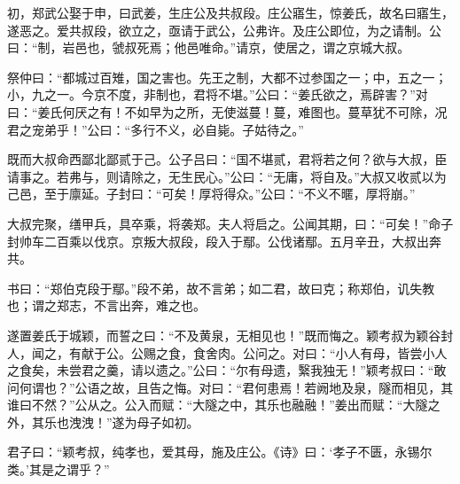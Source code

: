 
初，郑武公娶于申，曰武姜，生庄公及共叔段。庄公寤生，惊姜氏，故名曰寤生，遂恶之。爱共叔段，欲立之，亟请于武公，公弗许。及庄公即位，为之请制。公曰：“制，岩邑也，虢叔死焉；他邑唯命。”请京，使居之，谓之京城大叔。

祭仲曰：“都城过百雉，国之害也。先王之制，大都不过参国之一；中，五之一；小，九之一。今京不度，非制也，君将不堪。”公曰：“姜氏欲之，焉辟害？”对曰：“姜氏何厌之有！不如早为之所，无使滋蔓！蔓，难图也。蔓草犹不可除，况君之宠弟乎！”公曰：“多行不义，必自毙。子姑待之。”

既而大叔命西鄙北鄙贰于己。公子吕曰：“国不堪贰，君将若之何？欲与大叔，臣请事之。若弗与，则请除之，无生民心。”公曰：“无庸，将自及。”大叔又收贰以为己邑，至于廪延。子封曰：“可矣！厚将得众。”公曰：“不义不暱，厚将崩。”

大叔完聚，缮甲兵，具卒乘，将袭郑。夫人将启之。公闻其期，曰：“可矣！”命子封帅车二百乘以伐京。京叛大叔段，段入于鄢。公伐诸鄢。五月辛丑，大叔出奔共。

书曰：“郑伯克段于鄢。”段不弟，故不言弟；如二君，故曰克；称郑伯，讥失教也；谓之郑志，不言出奔，难之也。

遂置姜氏于城颖，而誓之曰：“不及黄泉，无相见也！”既而悔之。颖考叔为颖谷封人，闻之，有献于公。公赐之食，食舍肉。公问之。对曰：“小人有母，皆尝小人之食矣，未尝君之羹，请以遗之。”公曰：“尔有母遗，繄我独无！”颖考叔曰：“敢问何谓也？”公语之故，且告之悔。对曰：“君何患焉！若阙地及泉，隧而相见，其谁曰不然？”公从之。公入而赋：“大隧之中，其乐也融融！”姜出而赋：“大隧之外，其乐也洩洩！”遂为母子如初。

君子曰：“颖考叔，纯孝也，爱其母，施及庄公。《诗》曰：‘孝子不匮，永锡尔类。’其是之谓乎？”